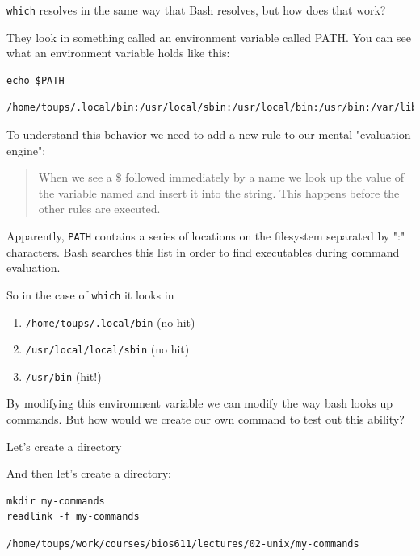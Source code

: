\documentclass[11pt]{article}
\begin{document}
\texttt{which} resolves in the same way that Bash resolves, but how does that
work?

They look  in something called an environment variable called
PATH. You can see what an environment variable holds like this:

\begin{verbatim}
echo $PATH
\end{verbatim}

\begin{verbatim}
/home/toups/.local/bin:/usr/local/sbin:/usr/local/bin:/usr/bin:/var/lib/flatpak/exports/bin:/usr/bin/site_perl:/usr/bin/vendor_perl:/usr/bin/core_perl:/var/lib/snapd/snap/bin
\end{verbatim}

To understand this behavior we need to add a new rule to our mental
"evaluation engine":

\label{orgbf44417}
\begin{quote}
When we see a \$ followed immediately by a name we look up the value of
the variable named and insert it into the string. This happens before
the other rules are executed.
\end{quote}

Apparently, \texttt{PATH} contains a series of locations on the filesystem
separated by ":" characters. Bash searches this list in order to find
executables during command evaluation.

So in the case of \texttt{which} it looks in 

\begin{enumerate}
\item \texttt{/home/toups/.local/bin} (no hit)
\item \texttt{/usr/local/local/sbin} (no hit)
\item \texttt{/usr/bin} (hit!)
\end{enumerate}

By modifying this environment variable we can modify the way bash
looks up commands. But how would we create our own command to test out
this ability?

Let's create a directory

And then let's create a directory:

\begin{verbatim}
mkdir my-commands
readlink -f my-commands
\end{verbatim}

\begin{verbatim}
/home/toups/work/courses/bios611/lectures/02-unix/my-commands
\end{verbatim}
\end{document}
